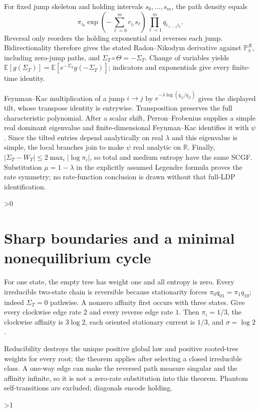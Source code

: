 \documentclass[10pt]{article}
\newcommand{\E}{\mathbb E}
\newcommand{\Pp}{\mathbb P}
\newcommand{\RR}{\mathbb R}
\begin{document}
For fixed jump skeleton and holding intervals $s_0,\ldots,s_m$, the path density equals
\[
 \pi_{i_0}\exp\!\left(-\sum_{\ell=0}^m r_{i_\ell}s_\ell\right)
 \prod_{\ell=1}^m q_{i_{\ell-1}i_\ell}.
\]
Reversal only reorders the holding exponential and reverses each jump.  Bidirectionality therefore gives the stated Radon--Nikodym derivative against $\Pp_\pi^R$, including zero-jump paths, and $\Sigma_T\circ\Theta=-\Sigma_T$.  Change of variables yields
$\E[g(\Sigma_T)]=\E[e^{-\Sigma_T}g(-\Sigma_T)]$; indicators and exponentials give every finite-time identity.

Feynman--Kac multiplication of a jump $i\to j$ by
$e^{-\lambda\log(q_{ij}/q_{ji})}$ gives the displayed tilt, whose transpose identity is entrywise.  Transposition preserves the full characteristic polynomial.  After a scalar shift, Perron--Frobenius supplies a simple real dominant eigenvalue and finite-dimensional Feynman--Kac identifies it with $\psi$. Since the tilted entries depend analytically on real $\lambda$ and this eigenvalue is simple, the local branches join to make $\psi$ real analytic on $\RR$. Finally,
$|\Sigma_T-W_T|\le 2\max_i|\log\pi_i|$, so total and medium entropy have the same SCGF.  Substitution $\mu=1-\lambda$ in the explicitly assumed Legendre formula proves the rate symmetry; no rate-function conclusion is drawn without that full-LDP identification.

\ifnum\CRevisionRound>0
\section{Sharp boundaries and a minimal nonequilibrium cycle}
For one state, the empty tree has weight one and all entropy is zero.  Every irreducible two-state chain is reversible because stationarity forces $\pi_0q_{01}=\pi_1q_{10}$; indeed $\Sigma_T=0$ pathwise.  A nonzero affinity first occurs with three states.  Give every clockwise edge rate $2$ and every reverse edge rate $1$.  Then $\pi_i=1/3$, the clockwise affinity is $3\log2$, each oriented stationary current is $1/3$, and $\sigma=\log2$.

Reducibility destroys the unique positive global law and positive rooted-tree weights for every root; the theorem applies after selecting a closed irreducible class.  A one-way edge can make the reversed path measure singular and the affinity infinite, so it is not a zero-rate substitution into this theorem.  Phantom self-transitions are excluded; diagonals encode holding.
\fi

\ifnum\CRevisionRound>1
\end{document}
